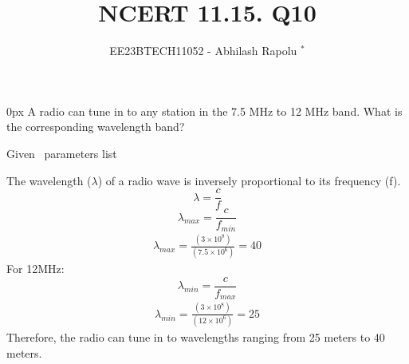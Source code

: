 \documentclass[journal,12pt,twocolumn]{IEEEtran}
\begin{document}

\vspace{3cm}
\title{NCERT 11.15. Q10}
\author{EE23BTECH11052 - Abhilash Rapolu $^{*}$%
}
\maketitle
\newpage
\bigskip
\renewcommand{\thetable}{\arabic{table}}

\parindent 0px
\Question A radio can tune in to any station in the 7.5 MHz to 12 MHz band.
 What is the corresponding wavelength band? 
\Solution  
\begin{table}[htbp] \small
\centering

\caption{Given \, parameters list}\end{table}
The wavelength ($\lambda$) of a radio wave is inversely proportional to its frequency (f).
\bgroup \obeylines
$$\lambda=\frac{c}{f}$$
$$\lambda_{max}=\frac{c}{f_{min}}$$
\egroup
\begin{align}
\lambda_{max}=\frac{(3\times10^{8})}{(7.5\times10^{6})}=40
\end{align}
For 12MHz:
$$\lambda_{min}=\frac{c}{f_{max}}$$
\begin{align}
\lambda_{min}=\frac{(3\times10^{8})}{(12\times10^{6})}=25
\end{align}
Therefore, the radio can tune in to wavelengths ranging from 25 meters to 40 meters.
\end{document}
